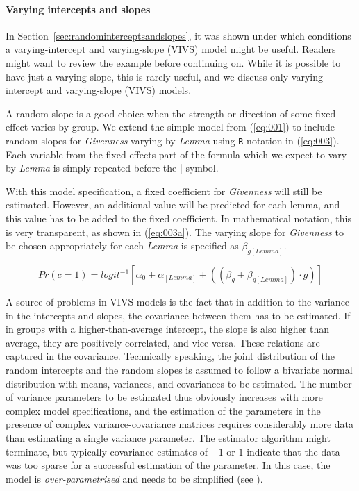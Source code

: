 \paragraph{Varying intercepts and slopes}

In Section~\ref{sec:randominterceptsandslopes}, it was shown under which conditions a varying-intercept and varying-slope (VIVS) model might be useful.
Readers might want to review the example before continuing on.
While it is possible to have just a varying slope, this is rarely useful, and we discuss only varying-intercept and varying-slope (VIVS) models.

A random slope is a good choice when the strength or direction of some fixed effect varies by group.
We extend the simple model from (\ref{eq:001}) to include random slopes for \textit{Givenness} varying by \textit{Lemma} using \texttt{R} notation in (\ref{eq:003}).
Each variable from the fixed effects part of the formula which we expect to vary by \textit{Lemma} is simply repeated before the | symbol.


With this model specification, a fixed coefficient for \textit{Givenness} will still be estimated.
However, an additional value will be predicted for each lemma, and this value has to be added to the fixed coefficient.
In mathematical notation, this is very transparent, as shown in (\ref{eq:003a}).
The varying slope for \textit{Givenness} to be chosen appropriately for each \textit{Lemma} is specified as $\beta_{g[Lemma]}$.

\begin{equation}
  Pr(c=1)=logit^{-1}\left[\alpha_0+\alpha_{[Lemma]}+((\beta_{g}+\beta_{g[Lemma]}) \cdot g)\right]
  \label{eq:003a}
\end{equation}

A source of problems in VIVS models is the fact that in addition to the variance in the intercepts and slopes, the covariance between them has to be estimated.
If in groups with a higher-than-average intercept, the slope is also higher than average, they are positively correlated, and vice versa.
These relations are captured in the covariance.
Technically speaking, the joint distribution of the random intercepts and the random slopes is assumed to follow a bivariate normal distribution with means, variances, and covariances to be estimated.
The number of variance parameters to be estimated thus obviously increases with more complex model specifications, and the estimation of the parameters in the presence of complex variance-covariance matrices requires considerably more data than estimating a single variance parameter.
The estimator algorithm might terminate, but typically covariance estimates of $-1$ or $1$ indicate that the data was too sparse for a successful estimation of the parameter.
In this case, the model is \textit{over-parametrised} and needs to be simplified (see \citealt{BatesEa2015a,MatuschekEa2017}).

